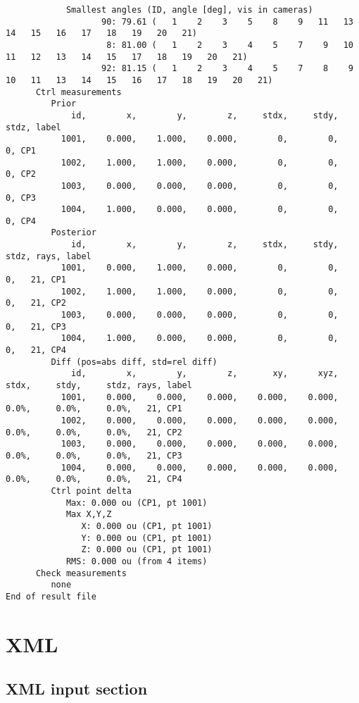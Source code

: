 \documentclass{article}
\begin{document}
\begin{verbatim}
            Smallest angles (ID, angle [deg], vis in cameras)
                   90: 79.61 (   1    2    3    5    8    9   11   13   14   15   16   17   18   19   20   21)
                    8: 81.00 (   1    2    3    4    5    7    9   10   11   12   13   14   15   17   18   19   20   21)
                   92: 81.15 (   1    2    3    4    5    7    8    9   10   11   13   14   15   16   17   18   19   20   21)
      Ctrl measurements
         Prior
             id,        x,        y,        z,     stdx,     stdy,     stdz, label
           1001,    0.000,    1.000,    0.000,        0,        0,        0, CP1
           1002,    1.000,    1.000,    0.000,        0,        0,        0, CP2
           1003,    0.000,    0.000,    0.000,        0,        0,        0, CP3
           1004,    1.000,    0.000,    0.000,        0,        0,        0, CP4
         Posterior
             id,        x,        y,        z,     stdx,     stdy,     stdz, rays, label
           1001,    0.000,    1.000,    0.000,        0,        0,        0,   21, CP1
           1002,    1.000,    1.000,    0.000,        0,        0,        0,   21, CP2
           1003,    0.000,    0.000,    0.000,        0,        0,        0,   21, CP3
           1004,    1.000,    0.000,    0.000,        0,        0,        0,   21, CP4
         Diff (pos=abs diff, std=rel diff)
             id,        x,        y,        z,       xy,      xyz,     stdx,     stdy,     stdz, rays, label
           1001,    0.000,    0.000,    0.000,    0.000,    0.000,     0.0%,     0.0%,     0.0%,   21, CP1
           1002,    0.000,    0.000,    0.000,    0.000,    0.000,     0.0%,     0.0%,     0.0%,   21, CP2
           1003,    0.000,    0.000,    0.000,    0.000,    0.000,     0.0%,     0.0%,     0.0%,   21, CP3
           1004,    0.000,    0.000,    0.000,    0.000,    0.000,     0.0%,     0.0%,     0.0%,   21, CP4
         Ctrl point delta
            Max: 0.000 ou (CP1, pt 1001)
            Max X,Y,Z
               X: 0.000 ou (CP1, pt 1001)
               Y: 0.000 ou (CP1, pt 1001)
               Z: 0.000 ou (CP1, pt 1001)
            RMS: 0.000 ou (from 4 items)
      Check measurements
         none
End of result file
\end{verbatim}

\newpage
\section{XML}
\label{sec:orgcba0e48}
\subsection{XML input section}
\label{sec:org19067c4}
\end{document}
